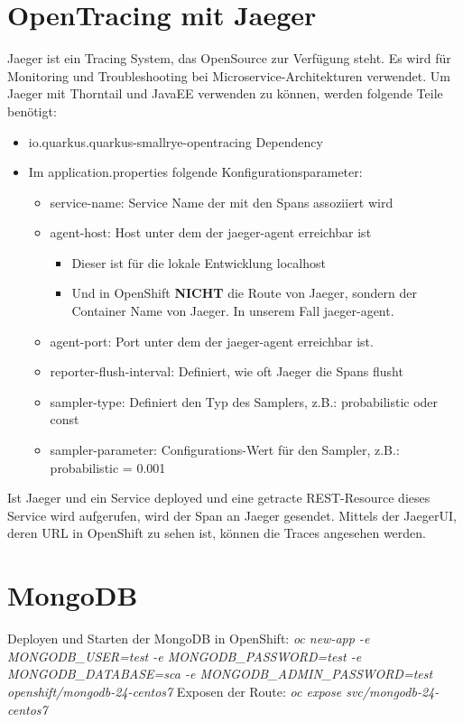 \documentclass[11pt, a4paper]{article}   	%
\begin{document}
\section{OpenTracing mit Jaeger}
Jaeger ist ein Tracing System, das OpenSource zur Verfügung steht. Es wird für Monitoring und Troubleshooting bei Microservice-Architekturen verwendet.
Um Jaeger mit Thorntail und JavaEE verwenden zu können, werden folgende Teile benötigt:
\begin{itemize}
	\item io.quarkus.quarkus-smallrye-opentracing  Dependency
	\item Im application.properties folgende Konfigurationsparameter:
	\begin{itemize}
		\item service-name: Service Name der mit den Spans assoziiert wird
		\item agent-host: Host unter dem der jaeger-agent erreichbar ist
		\begin{itemize}
			\item Dieser ist für die lokale Entwicklung localhost
			\item Und in OpenShift \textbf{NICHT} die Route von Jaeger, sondern der Container Name von Jaeger. In unserem Fall jaeger-agent.
		\end{itemize}
		\item agent-port: Port unter dem der jaeger-agent erreichbar ist.
		\item reporter-flush-interval: Definiert, wie oft Jaeger die Spans flusht
		\item sampler-type: Definiert den Typ des Samplers, z.B.: probabilistic oder const
		\item sampler-parameter: Configurations-Wert für den Sampler, z.B.: probabilistic = 0.001
	\end{itemize}
\end{itemize} 

Ist Jaeger und ein Service deployed und eine getracte REST-Resource dieses Service wird aufgerufen, wird der Span an Jaeger gesendet. Mittels der JaegerUI, deren URL in OpenShift zu sehen ist, können die Traces angesehen werden.

\section{MongoDB}
Deployen und Starten der MongoDB in OpenShift: \newline
\textit{oc new-app -e MONGODB\_USER=test -e MONGODB\_PASSWORD=test -e MONGODB\_DATABASE=sca -e MONGODB\_ADMIN\_PASSWORD=test openshift/mongodb-24-centos7} \newline
Exposen der Route: \newline
\textit{oc expose svc/mongodb-24-centos7}
\end{document}
